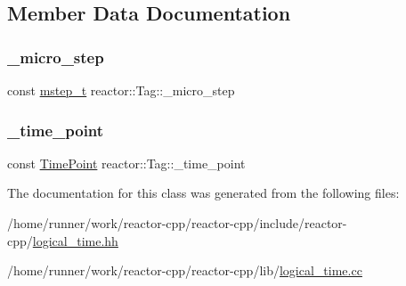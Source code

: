 \subsection{Member Data Documentation}
\mbox{\label{classreactor_1_1Tag_a7660e5c962c9916a04abe97fad3226ab}} 
\subsubsection{\texorpdfstring{\+\_\+micro\+\_\+step}{\_micro\_step}}
{\footnotesize\ttfamily const \hyperlink{namespacereactor_aaea1189d617982457b74127ba74a7340}{mstep\+\_\+t} reactor\+::\+Tag\+::\+\_\+micro\+\_\+step\hspace{0.3cm}{\ttfamily [private]}}

\mbox{\label{classreactor_1_1Tag_a24a75e25cfaac63128d8f925ee95c4d9}} 
\subsubsection{\texorpdfstring{\+\_\+time\+\_\+point}{\_time\_point}}
{\footnotesize\ttfamily const \hyperlink{namespacereactor_ad950f8d1a46612500286a4af0f167080}{Time\+Point} reactor\+::\+Tag\+::\+\_\+time\+\_\+point\hspace{0.3cm}{\ttfamily [private]}}



The documentation for this class was generated from the following files\+:\begin{DoxyCompactItemize}
\item 
/home/runner/work/reactor-\/cpp/reactor-\/cpp/include/reactor-\/cpp/\hyperlink{logical__time_8hh}{logical\+\_\+time.\+hh}\item 
/home/runner/work/reactor-\/cpp/reactor-\/cpp/lib/\hyperlink{logical__time_8cc}{logical\+\_\+time.\+cc}\end{DoxyCompactItemize}
